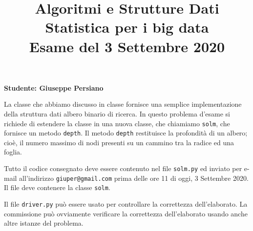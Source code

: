 \documentclass{amsart}
\begin{document}
\title{Algoritmi e Strutture Dati\\
Statistica per i big data\\
Esame del 3 Settembre 2020
}


\newcommand{\NomeStudente}{Giuseppe Persiano}
\newcommand{\nomeClasse}{solm}


\maketitle

\hfill{{\bf Studente: \NomeStudente}}

\smallskip
La classe {} che abbiamo discusso in classe fornisce una semplice 
implementazione della struttura dati albero binario di ricerca.
In questo problema d'esame si richiede di estendere la classe {}
in una nuova classe, che chiamiamo {\tt {\nomeClasse}},
che fornisce un metodo 
{\tt depth}. Il metodo {\tt depth} restituisce la profondit\`a di un
albero; cio\`e, il numero massimo di nodi presenti su un cammino 
tra la radice ed una foglia. 


\medskip{}
Tutto il codice consegnato deve essere contenuto nel file
{\tt \nomeClasse .py} ed inviato per e-mail all'indirizzo
{\tt giuper@gmail.com} prima delle ore 11 di oggi, 3 Settembre 2020.
Il file deve contenere la classe {\tt \nomeClasse}.

Il file {\tt driver.py} pu\`o essere usato per controllare la correttezza
dell'elaborato. 
La commissione pu\`o ovviamente verificare la correttezza dell'elaborato
usando anche altre istanze del problema.
\end{document}

